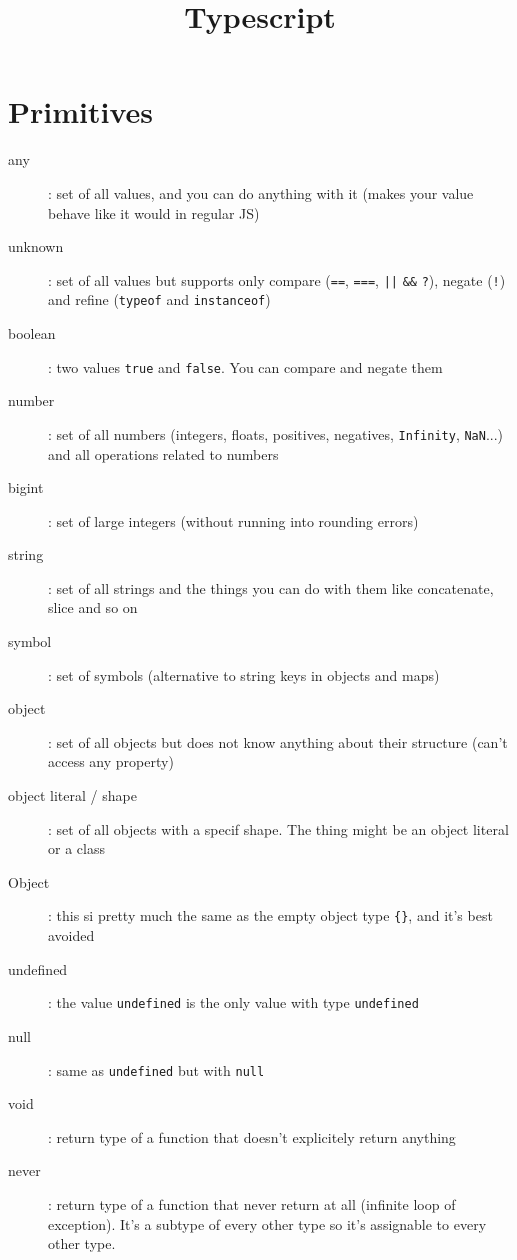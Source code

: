 \documentclass[french]{article}
\title{Typescript}
\begin{document}
\date{}

\maketitle

\section{Primitives}

\begin{description}
  \item[any]: set of all values, and you can do anything with it (makes your value behave like it would in regular JS)
  \item[unknown]: set of all values but supports only compare (\lstinline{==}, \lstinline{===}, \lstinline{||} \lstinline{&&} \lstinline{?}), negate (\lstinline{!}) and refine (\lstinline{typeof} and \lstinline{instanceof})
  \item[boolean]: two values \lstinline{true} and \lstinline{false}. You can compare and negate them
  \item[number]: set of all numbers (integers, floats, positives, negatives, \lstinline{Infinity}, \lstinline{NaN}...) and all operations related to numbers
  \item[bigint]: set of large integers (without running into rounding errors)
  \item[string]: set of all strings and the things you can do with them like concatenate, slice and so on
  \item[symbol]: set of symbols (alternative to string keys in objects and maps)
  \item[object]: set of all objects but does not know anything about their structure (can't access any property)
  \item[object literal / shape]: set of all objects with a specif shape. The thing might be an object literal or a class
  \item[Object]: this si pretty much the same as the empty object type \lstinline|{}|, and it's best avoided
  \item[undefined]: the value \lstinline{undefined} is the only value with type \lstinline{undefined}
  \item[null]: same as \lstinline{undefined} but with \lstinline{null}
  \item[void]: return type of a function that doesn't explicitely return anything
  \item[never]: return type of a function that never return at all (infinite loop of exception). It's a subtype of every other type so it's assignable to every other type.

\end{description}
\end{document}
